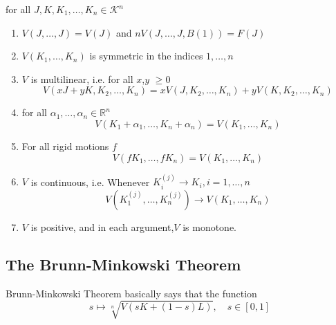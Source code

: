 \documentclass[oneside]{book}
\begin{document}
 for all $J, K, K_{1}, \ldots, K_{n} 
  \in \mathcal{K}^{n}$ \\ 
  \begin{enumerate}
      
  \item
$V(J, \ldots, J)=V(J)$ and $ nV(J, \ldots, J, B(1))=F(J)$ 

\item 
$V\left(K_{1}, \ldots, K_{n}\right)$ is symmetric in the indices $1,\ldots, n$
\item
 $V$ is multilinear, i.e.
 for all $ x$,$y$ $\geq 0 $
$$
V\left(x J+y K, K_{2}, \ldots, K_{n}\right)=x V\left(J, K_{2}, \ldots, K_{n}\right)+y V\left(K, K_{2}, \ldots, K_{n}\right)
$$
\item
for all $\alpha_{1}, \ldots, \alpha_{n} \in \mathbb{R}^{n}$
$$
V\left(K_{1}+\alpha_{1}, \ldots, K_{n}+\alpha_{n}\right)=V\left(K_{1}, \ldots, K_{n}\right)
$$
\item  
For all rigid motions $f$ 
$$ 
V\left(f K_{1}, \ldots, f K_{n}\right)=V\left(K_{1}, \ldots, K_{n}\right)
$$ 

\item
$V$ is continuous, i.e.
Whenever $K_{i}^{(j)} \rightarrow K_{i}, i=1, \ldots, n$
\[
V\left(K_{1}^{(j)}, \ldots, K_{n}^{(j)}\right) \rightarrow V\left(K_{1}, \ldots, K_{n}\right)
\]

\item $V$ is positive, and in each argument,$V$ is monotone.
 
 
  \end{enumerate}
 
 
 \subsection{The Brunn-Minkowski Theorem}
 
 Brunn-Minkowski Theorem  basically says that the function 
 \[s  \mapsto \sqrt[n]{V(s K+(1- s) L)}, \quad s \in[0,1]
\]
\end{document}
